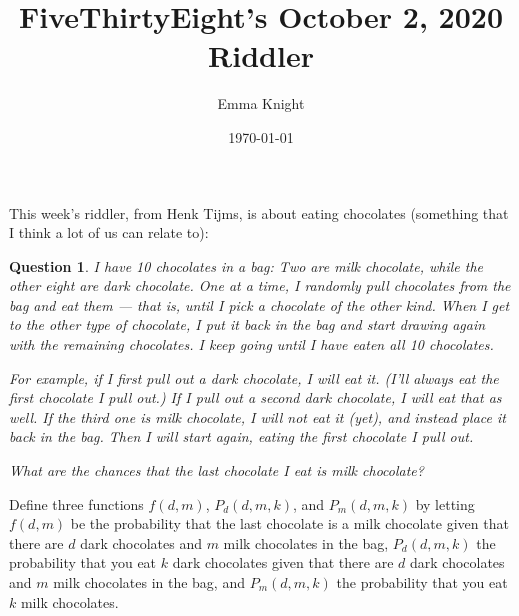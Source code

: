 \documentclass[11pt]{article}
\title{FiveThirtyEight's October 2, 2020 Riddler}
\author{Emma Knight}
\date{\today}
\newtheorem{question}[theorem]{Question}
\theoremstyle{definition}
\begin{document}
\maketitle
This week's riddler, from Henk Tijms, is about eating chocolates (something that I think a lot of us can relate to):
\begin{question}
I have 10 chocolates in a bag: Two are milk chocolate, while the other eight are dark chocolate. One at a time, I randomly pull chocolates from the bag and eat them — that is, until I pick a chocolate of the other kind. When I get to the other type of chocolate, I put it back in the bag and start drawing again with the remaining chocolates. I keep going until I have eaten all 10 chocolates.

For example, if I first pull out a dark chocolate, I will eat it. (I’ll always eat the first chocolate I pull out.) If I pull out a second dark chocolate, I will eat that as well. If the third one is milk chocolate, I will not eat it (yet), and instead place it back in the bag. Then I will start again, eating the first chocolate I pull out.

What are the chances that the last chocolate I eat is milk chocolate?
\end{question}
Define three functions $f(d, m)$, $P_d(d, m, k)$, and $P_m(d, m, k)$ by letting $f(d, m)$ be the probability that the last chocolate is a milk chocolate given that there are $d$ dark chocolates and $m$ milk chocolates in the bag, $P_d(d, m, k)$ the probability that you eat $k$ dark chocolates given that there are $d$ dark chocolates and $m$ milk chocolates in the bag, and $P_m(d, m, k)$ the probability that you eat $k$ milk chocolates.
\end{document}
